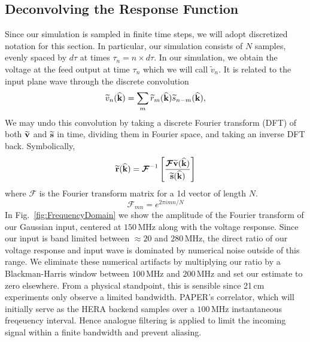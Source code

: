 \documentclass[twocolumn]{emulateapj}
\begin{document}
\subsection{Deconvolving the Response Function}\label{ssec:Deconvolve}
Since our simulation is sampled in finite time steps, we will adopt discretized notation for this section. In particular, our simulation consists of $N$ samples, evenly spaced by $d \tau$ at times $\tau_n = n \times d \tau$. 
In our simulation, we obtain the voltage at the feed output at time $\tau_n$ which we will call $\widetilde{v}_n$. It is related to the input plane wave through the discrete convolution 
\begin{equation}
\widetilde{v}_n({\bf \widehat{k}}) = \sum_m \widetilde{r}_m({\bf \widehat{k}}) \widetilde{s}_{n-m}({\bf \widehat{k}}),
\end{equation}
We may undo this convolution by taking a discrete Fourier transform (DFT) of both ${\bf \widetilde{v}}$ and ${\bf \widetilde{s}}$ in time, dividing them in Fourier space, and taking an inverse DFT back. Symbolically,
\begin{equation}
{\bf \widetilde{r}}({\bf \widehat{k}}) = \boldsymbol{\mathcal{F}}^{-1} \left[ \frac{\boldsymbol{\mathcal{F}} {\bf \widetilde{v}}({\bf \widehat{k}})}{{\bf \widetilde{s}}({\bf \widehat{k}})} \right] 
\end{equation}
where $\boldsymbol{\mathcal{F}}$ is the Fourier transform matrix for a 1d vector of length $N$. 
\begin{equation}
\boldsymbol{\mathcal{F}}_{mn} = e^{2 \pi i m n /N}
\end{equation}
In Fig.~\ref{fig:FrequencyDomain} we show the amplitude of the Fourier transform of our Gaussian input, centered at $150$\,MHz along with the voltage response. Since our input is band limited between $\approx 20$ and $280$\,MHz, the direct ratio of our voltage response and input wave is dominated by numerical noise outside of this range. We eliminate these numerical artifacts by multiplying our ratio by a Blackman-Harris window between $100$\,MHz and $200$\,MHz and set our estimate to zero elsewhere. From a physical standpoint, this is sensible since 21\,cm experiments only observe a limited bandwidth. PAPER's correlator, which will initially serve as the HERA backend samples over a $100$\,MHz instantaneous freqeuency interval. Hence analogue filtering is applied to limit the incoming signal within a finite bandwidth and prevent aliasing.
\end{document}
